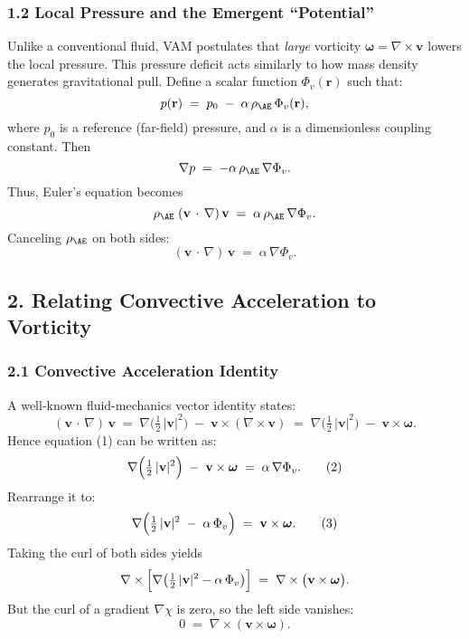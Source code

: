 \documentclass[aps,preprint,superscriptaddress]{revtex4-2}
\begin{document}
    \subsubsection*{1.2 Local Pressure and the Emergent “Potential”}
    Unlike a conventional fluid, VAM postulates that \textit{large} vorticity \(\boldsymbol{\omega} = \nabla \times \mathbf{v}\) lowers the local pressure. This pressure deficit acts similarly to how mass density generates gravitational pull. Define a scalar function \(\Phi_v(\mathbf{r})\) such that:
    \[
        p(\mathbf{r})
        \;=\;
        p_0 \;-\; \alpha \,\rho_{\mathrm{\AE}}\,\Phi_v(\mathbf{r}),
    \]
    where \(p_0\) is a reference (far-field) pressure, and \(\alpha\) is a dimensionless coupling constant. Then
    \[
        \nabla p
        \;=\;
        -\alpha \,\rho_{\mathrm{\AE}} \,\nabla \Phi_v.
    \]
    Thus, Euler’s equation becomes
    \[
        \rho_{\mathrm{\AE}}\;(\mathbf{v}\,\cdot\,\nabla)\,\mathbf{v}
        \;=\;
        \alpha\,\rho_{\mathrm{\AE}}\,\nabla \Phi_v.
    \]
    Canceling \(\rho_{\mathrm{\AE}}\) on both sides:
    \[
        (\mathbf{v}\,\cdot\,\nabla)\,\mathbf{v}
        \;=\;
        \alpha\,\nabla \Phi_v.
        \tag{1}
    \]

    \subsection*{2. Relating Convective Acceleration to Vorticity}

    \subsubsection*{2.1 Convective Acceleration Identity}
    A well-known fluid-mechanics vector identity states:
    \[
        (\mathbf{v}\,\cdot\,\nabla)\,\mathbf{v}
        \;=\;
        \nabla\!\bigl(\tfrac12\,|\mathbf{v}|^2\bigr)
        \;-\;
        \mathbf{v}\times(\nabla\times \mathbf{v})
        \;=\;
        \nabla\bigl(\tfrac12\,|\mathbf{v}|^2\bigr)
        \;-\;
        \mathbf{v}\times \boldsymbol{\omega}.
    \]
    Hence equation (1) can be written as:
    \[
        \nabla
        \Bigl(
        \tfrac12 \,\lvert \mathbf{v}\rvert^2
        \Bigr)
        \;-\;
        \mathbf{v}\times \boldsymbol{\omega}
        \;=\;
        \alpha \,\nabla \Phi_v.
        \tag{2}
    \]
    Rearrange it to:
    \[
        \nabla
        \Bigl(
        \tfrac12\,|\mathbf{v}|^2
        \;-\;
        \alpha\,\Phi_v
        \Bigr)
        \;=\;
        \mathbf{v}\times \boldsymbol{\omega}.
        \tag{3}
    \]
    Taking the curl of both sides yields
    \[
        \nabla \times \Bigl[
            \nabla\bigl(
            \tfrac12\,|\mathbf{v}|^2 - \alpha\,\Phi_v
            \bigr)
            \Bigr]
        \;=\;
        \nabla \times \bigl(\mathbf{v}\times \boldsymbol{\omega}\bigr).
    \]
    But the curl of a gradient \(\nabla \chi\) is zero, so the left side vanishes:
    \[
        0
        \;=\;
        \nabla \times (\mathbf{v}\times \boldsymbol{\omega}).
        \tag{4}
    \]
\end{document}
